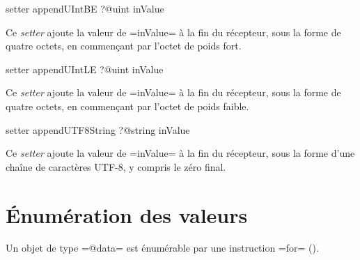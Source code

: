 
\begin{galgas}
setter appendUIntBE ?@uint inValue
\end{galgas}

Ce \emph{setter} ajoute la valeur de \ggs=inValue= à la fin du récepteur, sous la forme de quatre octets, en commençant par l'octet de poids fort.










\begin{galgas}
setter appendUIntLE ?@uint inValue
\end{galgas}

Ce \emph{setter} ajoute la valeur de \ggs=inValue= à la fin du récepteur, sous la forme de quatre octets, en commençant par l'octet de poids faible.












\begin{galgas}
setter appendUTF8String ?@string inValue
\end{galgas}

Ce \emph{setter} ajoute la valeur de \ggs=inValue= à la fin du récepteur, sous la forme d'une chaîne de caractères UTF-8, y compris le zéro final.


\section{Énumération des valeurs}

Un objet de type \ggs=@data= est énumérable par une instruction \ggs=for= ().
